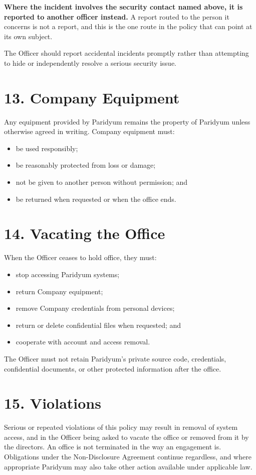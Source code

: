 \documentclass{paridyum}
\begin{document}
\vspace{0.3em}
\textbf{Where the incident involves the security contact named above, it is reported to
another officer instead.} A report routed to the person it concerns is not a report, and
this is the one route in the policy that can point at its own subject.

\vspace{0.3em}
The Officer should report accidental incidents promptly rather than attempting to hide
or independently resolve a serious security issue.

\section*{13. Company Equipment}
Any equipment provided by Paridyum remains the property of Paridyum unless otherwise
agreed in writing. Company equipment must:
\begin{itemize}[leftmargin=*, noitemsep]
    \item be used responsibly;
    \item be reasonably protected from loss or damage;
    \item not be given to another person without permission; and
    \item be returned when requested or when the office ends.
\end{itemize}

\section*{14. Vacating the Office}
When the Officer ceases to hold office, they must:
\begin{itemize}[leftmargin=*, noitemsep]
    \item stop accessing Paridyum systems;
    \item return Company equipment;
    \item remove Company credentials from personal devices;
    \item return or delete confidential files when requested; and
    \item cooperate with account and access removal.
\end{itemize}
The Officer must not retain Paridyum's private source code, credentials, confidential
documents, or other protected information after the office.

\section*{15. Violations}
Serious or repeated violations of this policy may result in removal of system access, and
in the Officer being asked to vacate the office or removed from it by the directors. An
office is not terminated in the way an engagement is. Obligations under the
Non-Disclosure Agreement continue regardless, and where appropriate Paridyum may also
take other action available under applicable law.
\end{document}
